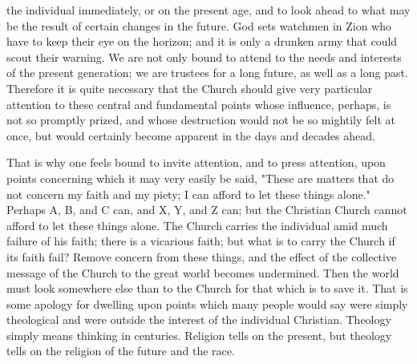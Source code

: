 \documentclass[12pt,a5paper,twoside,titlepage]{book}
\begin{document}
the individual immediately, or on the present 
age, and to look ahead to what may be the 
result of certain changes in the future. God 
sets watchmen in Zion who have to keep their 
eye on the horizon; and it is only a drunken 
army that could scout their warning. We are 
not only bound to attend to the needs and 
interests of the present generation; we are 
trustees for a long future, as well as a long 
past. Therefore it is quite necessary that the 
Church should give very particular attention 
to these central and fundamental points whose 
influence, perhaps, is not so promptly prized, 
and whose destruction would not be so mightily 
felt at once, but would certainly become apparent 
in the days and decades ahead. 

That is why one feels bound to invite attention, 
and to press attention, upon points concerning 
which it may very easily be said, "These 
are matters that do not concern my faith and 
my piety; I can afford to let these things alone." 
Perhaps A, B, and C can, and X, Y, and Z can; 
but the Christian Church cannot afford to let 
these things alone. The Church carries the 
individual amid much failure of his faith; 
there is a vicarious faith; but what is to 
carry the Church if its faith fail? Remove 
concern from these things, and the effect of 
the collective message of the Church to the 
great world becomes undermined. Then the 
world must look somewhere else than to the 
Church for that which is to save it. That is 
some apology for dwelling upon points which 
many people would say were simply theological 
and were outside the interest of the individual 
Christian. Theology simply means thinking in 
centuries. Religion tells on the present, but 
theology tells on the religion of the future 
and the race. 
\end{document}
